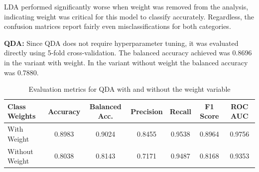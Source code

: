 \documentclass[a4paper,12pt]{article}
\begin{document}
LDA performed significantly worse when weight was removed from the analysis, indicating weight was critical for this model to classify accurately. Regardless, the confusion matrices report fairly even misclassifications for both categories.

\textbf{QDA:}
Since QDA does not require hyperparameter tuning, it was evaluated directly using 5-fold cross-validation. The balanced accuracy achieved was 0.8696 in the variant with weight. In the variant without weight the balanced accuracy was 0.7880.


\begin{table}[H]
\centering
\small
\begin{tabular}{lcccccc}
\toprule
\textbf{Class Weights} & \textbf{Accuracy} & \textbf{Balanced Acc.} & \textbf{Precision} & \textbf{Recall} & \textbf{F1 Score} & \textbf{ROC AUC} \\
\midrule
With Weight & 0.8983 & 0.9024 & 0.8455 & 0.9538 & 0.8964 & 0.9756 \\
Without Weight & 0.8038 & 0.8143 & 0.7171 & 0.9487 & 0.8168 & 0.9353 \\
\bottomrule
\end{tabular}
\caption{Evaluation metrics for QDA with and without the weight variable}
\label{tab:qda_weights}
\end{table}
\end{document}

